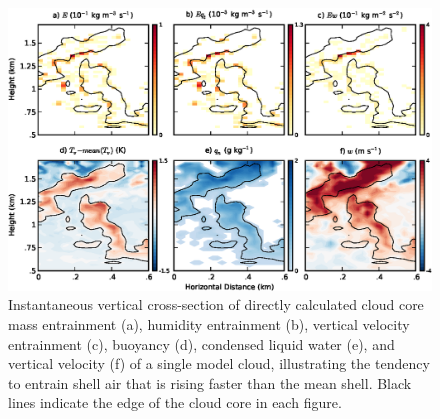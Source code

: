 \documentclass[12pt]{article}
\begin{document}
\begin{figure}[t]
  \noindent\includegraphics[width=39pc]{./figures/w_entrainment_example}
  \caption{Instantaneous vertical cross-section of directly calculated 
  cloud core mass entrainment (a), humidity entrainment (b), vertical 
  velocity entrainment (c), buoyancy (d), condensed liquid water (e), 
  and vertical velocity (f) of a single model cloud, illustrating the 
  tendency to entrain shell air that is rising faster than the mean 
  shell.  Black lines indicate the edge of the cloud core in each 
  figure.}
  \label{fig:w_entrainment_example}
\end{figure}
\end{document}
